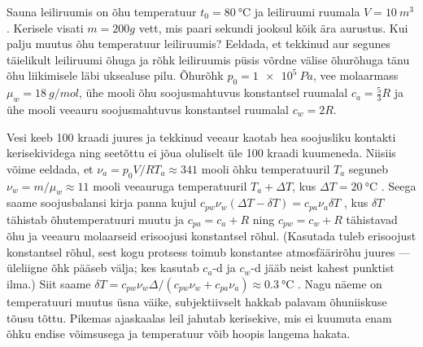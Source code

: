 \setAuthor{}

Sauna leiliruumis on õhu temperatuur $t_0=\SI{80}\celsius$ ja leiliruumi ruumala $V=\SI{10}{m^3}$. Kerisele visati $m=\SI{200}g$ vett, mis paari sekundi jooksul kõik ära aurustus. Kui palju muutus õhu temperatuur leiliruumis? Eeldada, et tekkinud aur segunes täielikult leiliruumi õhuga ja rõhk leiliruumis püsis võrdne välise õhurõhuga tänu õhu liikimisele läbi uksealuse pilu. Õhurõhk $p_0=\SI{1e5}{Pa}$, vee molaarmass  $\mu_w=\SI{18}{g/mol}$, ühe mooli õhu soojusmahtuvus konstantsel ruumalal $c_a=\frac 53 R$ ja ühe mooli veeauru soojusmahtuvus konstantsel ruumalal $c_w=2R$. 


\hint

\solu
Vesi keeb 100 kraadi juures ja tekkinud veeaur kaotab hea soojusliku kontakti kerisekividega ning seetõttu ei jõua oluliselt üle 100 kraadi kuumeneda.  Niisiis võime eeldada, et $\nu_a=p_0V/RT_a\approx 341$ mooli õhku  temperatuuril $T_a$ seguneb $\nu_w=m/\mu_w\approx 11$ mooli veeauruga  temperatuuril $T_a+\Delta T$, kus $\Delta T=\SI {20}\celsius$ . Seega saame soojusbalansi kirja panna kujul $c_{pw}\nu_w(\Delta T-\delta T)=c_{pa}\nu_a\delta T$ , kus $\delta T$ tähistab õhutemperatuuri muutu ja $c_{pa}=c_a+R$  ning $c_{pw}=c_w+R$  tähistavad õhu ja veeauru molaarseid erisoojusi konstantsel rõhul. (Kasutada tuleb erisoojust konstantsel rõhul, sest kogu protsess toimub konstantse atmosfäärirõhu juures --- üleliigne õhk pääseb välja; kes kasutab $c_a$-d ja $c_w$-d jääb neist kahest punktist ilma.) Siit saame $\delta T=c_{pw}\nu_w\Delta/(c_{pw}\nu_w+c_{pa}\nu_a)\approx\SI{0.3}\celsius$ . Nagu näeme on temperatuuri muutus üsna väike, subjektiivselt hakkab palavam õhuniiskuse tõusu tõttu. Pikemas ajaskaalas leil jahutab kerisekive, mis ei kuumuta enam õhku endise võimsusega ja temperatuur võib hoopis langema hakata.
\probend